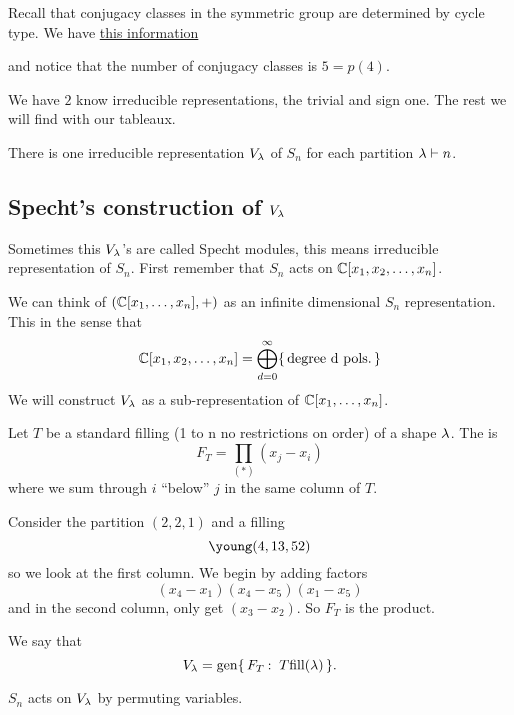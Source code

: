 \documentclass[12pt]{memoir}
\begin{document}
\begin{Ex}
    Recall that conjugacy classes in the symmetric group are determined by cycle type. We have \href{https://groupprops.subwiki.org/wiki/Symmetric_group:S4#Conjugacy_class_structure}{this information}

    and notice that the number of conjugacy classes is $5=p(4)$.\par 
    We have $2$ know irreducible representations, the trivial and sign one. The rest we will find with our tableaux.
\end{Ex}

\begin{Prop}
    There is one irreducible representation $V_\lambda$ of $S_n$ for each partition $\lambda\vdash n$.
\end{Prop}

\subsection{Specht's construction of $V_\lambda$}

Sometimes this $V_\lambda$'s are called Specht modules, this means irreducible representation of $S_n$. First remember that $S_n$ acts on $\mathbb{C}[x_1,x_2,\dots,x_n]$.\par 
We can think of $(\mathbb{C}[x_1,\dots,x_n],+)$ as an infinite dimensional $S_n$ representation. This in the sense that 
$$\mathbb{C}[x_1,x_2,\dots,x_n]=\bigoplus_{d=0}^\infty\{\,\text{degree d pols.}\,\}$$
We will construct $V_\lambda$ as a sub-representation of $\mathbb{C}[x_1,\dots,x_n]$.

\begin{Def}
    Let $T$ be a standard filling (1 to n no restrictions on order) of a shape $\lambda$. The  is 
    $$F_T=\prod_{(\ast)}(x_j-x_i)$$
    where we sum through $i$ ``below'' $j$ in the same column of $T$.
\end{Def}

\begin{Ex}
    Consider the partition $(2,2,1)$ and a filling
    $$\young(4,13,52)$$
    so we look at the first column. We begin by adding factors 
    $$(x_4-x_1)(x_4-x_5)(x_1-x_5)$$
    and in the second column, only get $(x_3-x_2)$. So $F_T$ is the product.
\end{Ex}

\begin{Def}
    We say that 
    $$V_\la=\gen\set{F_T\:\ T\text{fill}(\la)}.$$
\end{Def}

\begin{Lem}
    $S_n$ acts on $V_\lambda$ by permuting variables.
\end{Lem}
\end{document}

